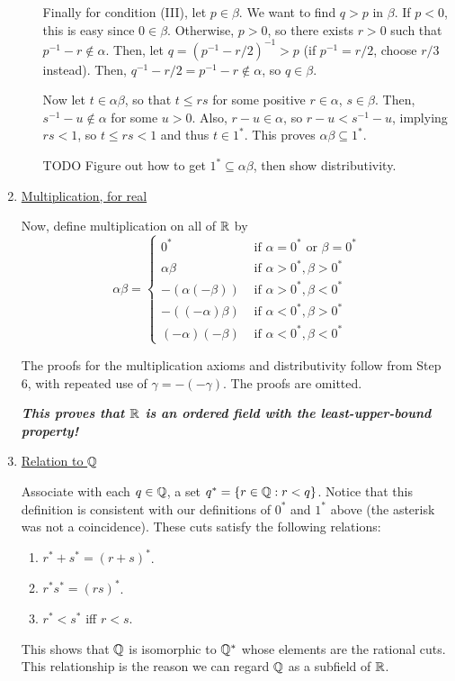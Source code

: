 \begin{enumerate}[Step 1.]
\begin{enumerate}[({M}1)]
Finally for condition (III), let $p \in \beta$. We want to find $q > p$ in $\beta$. If $p < 0$, this is easy since $0 \in \beta$. Otherwise, $p > 0$, so there exists $r > 0$ such that $p^{-1} - r \not\in \alpha$. Then, let $q = (p^{-1} - r/2)^{-1} > p$ (if $p^{-1} = r/2$, choose $r/3$ instead). Then, $q^{-1} - r/2 = p^{-1} - r \not\in \alpha$, so $q \in \beta$.

Now let $t \in \alpha\beta$, so that $t \le rs$ for some positive $r \in \alpha$, $s \in \beta$. Then, $s^{-1} - u \not\in \alpha$ for some $u > 0$. Also, $r - u \in \alpha$, so $r - u < s^{-1} - u$, implying $rs < 1$, so $t \le rs < 1$ and thus $t \in 1^*$. This proves $\alpha\beta \subseteq 1^*$. 

TODO Figure out how to get $1^* \subseteq \alpha\beta$, then show distributivity. 
\end{enumerate}

\item \underline{Multiplication, for real}

Now, define multiplication on all of $\mathbb{R}$ by
\[
	\alpha \beta = 
	\begin{cases}
		0^*	& \text{ if } \alpha = 0^* \text{ or } \beta = 0^* \\
		\alpha \beta & \text{ if } \alpha > 0^*, \beta > 0^* \\
		-(\alpha (-\beta)) & \text{ if } \alpha > 0^*, \beta < 0^* \\
		-((-\alpha) \beta) & \text{ if } \alpha < 0^*, \beta > 0^* \\
		(-\alpha)(-\beta) & \text{ if } \alpha < 0^*, \beta < 0^*
	\end{cases}
\]

The proofs for the multiplication axioms and distributivity follow from Step 6, with repeated use of $\gamma = -(-\gamma)$. The proofs are omitted.

\textbf{\textit{This proves that $\mathbb{R}$ is an ordered field with the least-upper-bound property!}}

\item \underline{Relation to $\mathbb{Q}$}

Associate with each $q \in \mathbb{Q}$, a set $q^* = \{r \in \mathbb{Q} : r < q\}$. Notice that this definition is consistent with our definitions of $0^*$ and $1^*$ above (the asterisk was not a coincidence). These cuts satisfy the following relations:

\begin{enumerate}
\item $r^* + s^* = (r + s)^*$.
\item $r^* s^* = (rs)^*$.
\item $r^* < s^*$ iff $r < s$.
\end{enumerate} 

This shows that $\mathbb{Q}$ is isomorphic to $\mathbb{Q}^*$ whose elements are the rational cuts. This relationship is the reason we can regard $\mathbb{Q}$ as a subfield of $\mathbb{R}$. 
\end{enumerate}

